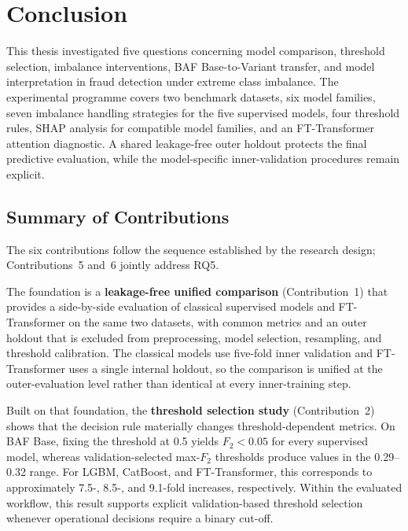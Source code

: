 \chapter{Conclusion}
\label{sec:conclusion}

This thesis investigated five questions concerning model comparison, threshold selection, imbalance interventions, BAF Base-to-Variant transfer, and model interpretation in fraud detection under extreme class imbalance. The experimental programme covers two benchmark datasets, six model families, seven imbalance handling strategies for the five supervised models, four threshold rules, SHAP analysis for compatible model families, and an FT-Transformer attention diagnostic. A shared leakage-free outer holdout protects the final predictive evaluation, while the model-specific inner-validation procedures remain explicit.

\section{Summary of Contributions}
\label{sec:contributions_summary}

The six contributions follow the sequence established by the research design; Contributions~5 and~6 jointly address RQ5.

The foundation is a \textbf{leakage-free unified comparison} (Contribution~1) that provides a side-by-side evaluation of classical supervised models and FT-Transformer on the same two datasets, with common metrics and an outer holdout that is excluded from preprocessing, model selection, resampling, and threshold calibration. The classical models use five-fold inner validation and FT-Transformer uses a single internal holdout, so the comparison is unified at the outer-evaluation level rather than identical at every inner-training step.

Built on that foundation, the \textbf{threshold selection study} (Contribution~2) shows that the decision rule materially changes threshold-dependent metrics. On BAF Base, fixing the threshold at 0.5 yields $F_2<0.05$ for every supervised model, whereas validation-selected max-$F_2$ thresholds produce values in the 0.29--0.32 range. For LGBM, CatBoost, and FT-Transformer, this corresponds to approximately 7.5-, 8.5-, and 9.1-fold increases, respectively. Within the evaluated workflow, this result supports explicit validation-based threshold selection whenever operational decisions require a binary cut-off.

